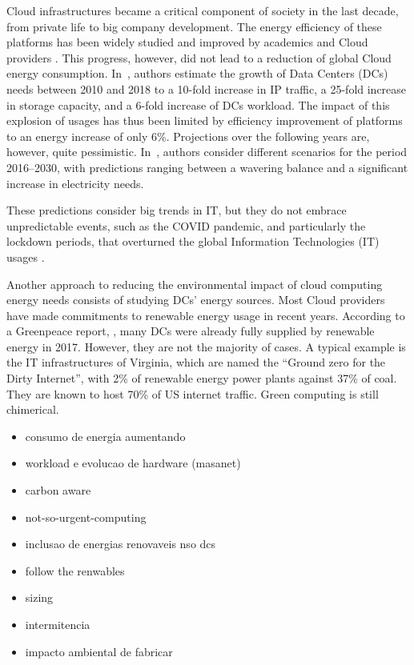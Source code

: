 
Cloud infrastructures became a critical component of society in the
last decade, from private life to big company development. The energy
efficiency of these platforms has been widely studied and improved by
academics and Cloud providers \cite{muralidhar2020energy}. This
progress, however, did not lead to a reduction of global Cloud energy
consumption. In~\cite{masanet2020recalibrating}, authors estimate the
growth of Data Centers (DCs) needs between 2010 and 2018 to a 10-fold
increase in IP traffic, a 25-fold increase in storage capacity, and a
6-fold increase of DCs workload. The impact of this explosion of
usages has thus been limited by efficiency improvement of platforms to
an energy increase of only 6\%. Projections over the following years
are, however, quite pessimistic. In~\cite{koot2021usage}, authors
consider different scenarios for the period 2016--2030, with
predictions ranging between a wavering balance and a significant
increase in electricity needs.


These predictions consider big trends in IT, but they do not embrace
unpredictable events, such as the COVID pandemic, and particularly the
lockdown periods, that overturned the global Information Technologies
(IT) usages \cite{feldmann2021implications}.


Another approach to reducing the environmental impact of cloud
computing energy needs consists of studying DCs' energy sources. Most
Cloud providers have made commitments to renewable energy usage in
recent years. According to a Greenpeace report, \cite{greenpeace2017},
many DCs were already fully supplied by renewable energy in
2017. However, they are not the majority of cases. A typical example
is the IT infrastructures of Virginia, which are named the ``Ground
zero for the Dirty Internet'', with 2\% of renewable energy power
plants against 37\% of coal. They are known to host 70\% of US
internet traffic. Green computing is still chimerical.





\begin{itemize}

  
   \item consumo de energia aumentando
   \item workload e evolucao de hardware (masanet)
   \item carbon aware
   \item not-so-urgent-computing
   \item inclusao de energias renovaveis nso dcs
   \item follow the renwables
   \item sizing
   \item intermitencia
   \item impacto ambiental de fabricar

\end{itemize}

